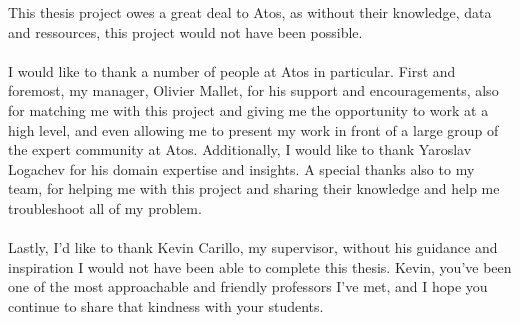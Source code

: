 \begin{acknowledgments}
This thesis project owes a great deal to Atos, as without their knowledge, data and ressources, this project would not have been possible. \\
\\
I would like to thank a number of people at Atos in particular. First and foremost, my manager, Olivier Mallet, for his support and encouragements, also for matching me with this project and giving me the opportunity to work at a high level, and even allowing me to present my work in front of a large group of the expert community at Atos. Additionally, I would like to thank Yaroslav Logachev for his domain expertise and insights. A special thanks also to my team, for helping me with this project and sharing their knowledge and help me troubleshoot all of my problem.\\
\\
Lastly, I’d like to thank Kevin Carillo, my supervisor, without his guidance and inspiration I would not have been able to complete this thesis. Kevin, you’ve been one of the most approachable and friendly professors I’ve met, and I hope you continue to share that kindness with your students.
\end{acknowledgments}
